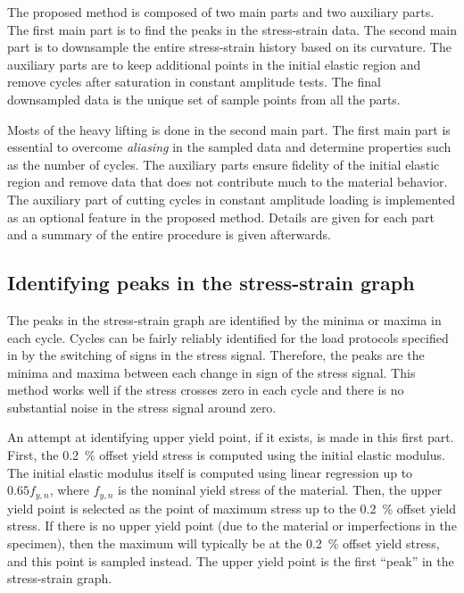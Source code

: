 \documentclass[a4paper,11pt]{article}
\begin{document}
The proposed method is composed of two main parts and two auxiliary parts.
The first main part is to find the peaks in the stress-strain data.
The second main part is to downsample the entire stress-strain history based on its curvature.
The auxiliary parts are to keep additional points in the initial elastic region and remove cycles after saturation in constant amplitude tests.
The final downsampled data is the unique set of sample points from all the parts.

Mosts of the heavy lifting is done in the second main part.
The first main part is essential to overcome \emph{aliasing} in the sampled data and determine properties such as the number of cycles.
The auxiliary parts ensure fidelity of the initial elastic region and remove data that does not contribute much to the material behavior.
The auxiliary part of cutting cycles in constant amplitude loading is implemented as an optional feature in the proposed method.
Details are given for each part and a summary of the entire procedure is given afterwards.

\subsection{Identifying peaks in the stress-strain graph}

The peaks in the stress-strain graph are identified by the minima or maxima in each cycle.
Cycles can be fairly reliably identified for the load protocols specified in \citet{deCastroeSousaConsistencySolvingInverse2020} by the switching of signs in the stress signal.
Therefore, the peaks are the minima and maxima between each change in sign of the stress signal.
This method works well if the stress crosses zero in each cycle and there is no substantial noise in the stress signal around zero.

An attempt at identifying upper yield point, if it exists, is made in this first part.
First, the 0.2~\% offset yield stress is computed using the initial elastic modulus.
The initial elastic modulus itself is computed using linear regression up to $0.65 f_{y,n}$, where $f_{y,n}$ is the nominal yield stress of the material.
Then, the upper yield point is selected as the point of maximum stress up to the 0.2~\% offset yield stress.
If there is no upper yield point (due to the material or imperfections in the specimen), then the maximum will typically be at the 0.2~\% offset yield stress, and this point is sampled instead.
The upper yield point is the first ``peak'' in the stress-strain graph.
\end{document}
